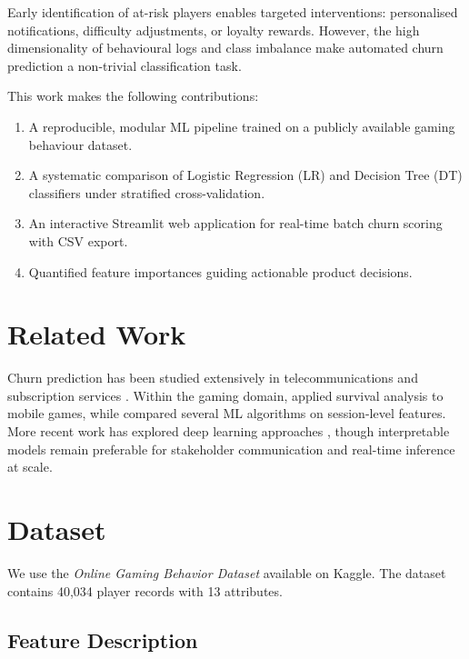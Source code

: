 \documentclass[conference]{IEEEtran}
\begin{document}
Early identification of at-risk players enables targeted interventions:
personalised notifications, difficulty adjustments, or loyalty rewards.
However, the high dimensionality of behavioural logs and class imbalance make
automated churn prediction a non-trivial classification task.

This work makes the following contributions:
\begin{enumerate}
  \item A reproducible, modular ML pipeline trained on a publicly available
        gaming behaviour dataset.
  \item A systematic comparison of Logistic Regression (LR) and Decision Tree
        (DT) classifiers under stratified cross-validation.
  \item An interactive Streamlit web application for real-time batch churn
        scoring with CSV export.
  \item Quantified feature importances guiding actionable product decisions.
\end{enumerate}

\section{Related Work}

Churn prediction has been studied extensively in telecommunications
\cite{verbeke2012} and subscription services \cite{seo2020}.  Within the
gaming domain, \cite{runge2014} applied survival analysis to mobile games, while
\cite{hadiji2014} compared several ML algorithms on session-level features.
More recent work has explored deep learning approaches \cite{wangchurn2022},
though interpretable models remain preferable for stakeholder communication
and real-time inference at scale.

\section{Dataset}

We use the \emph{Online Gaming Behavior Dataset} \cite{elkharoua2024} available
on Kaggle.  The dataset contains 40{,}034 player records with 13 attributes.

\subsection{Feature Description}
\end{document}
